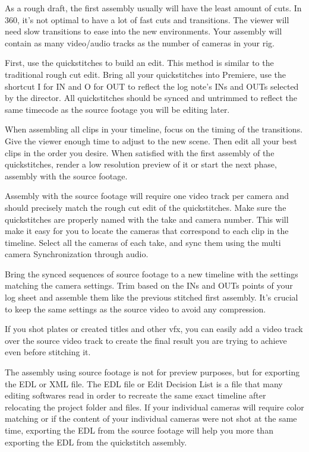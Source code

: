 \begin{fullwidth}
As a rough draft, the first assembly usually will have the least amount of cuts. In 360, it’s not optimal to have a lot of fast cuts and transitions. The viewer will need slow transitions to ease into the new environments. Your assembly will contain as many video/audio tracks as the number of cameras in your rig. 

First, use the quickstitches to build an edit. This method is similar to the traditional rough cut edit. Bring all your quickstitches into Premiere, use the shortcut I for IN and O for OUT to reflect the log note’s INs and OUTs selected by the director. All quickstitches should be synced and untrimmed to reflect the same timecode as the source footage you will be editing later.

When assembling all clips in your timeline, focus on the timing of the transitions. Give the viewer enough time to adjust to the new scene. Then edit all your best clips in the order you desire. When satisfied with the first assembly of the quickstitches, render a low resolution preview of it or start the next phase, assembly with the source footage.


Assembly with the source footage will require one video track per camera and should precisely match the rough cut edit of the quickstitches. Make sure the quickstitches are properly named with the take and camera number. This will make it easy for you to locate the cameras that correspond to each clip in the timeline. Select all the cameras of each take, and sync them using the multi camera Synchronization through audio.

Bring the synced sequences of source footage to a new timeline with the settings matching the camera settings. Trim based on the INs and OUTs points of your log sheet and assemble them like the previous stitched first assembly. It’s crucial to keep the same settings as the source video to avoid any compression. 

If you shot plates or created titles and other vfx, you can easily add a video track over the source video track to create the final result you are trying to achieve even before stitching it.


The assembly using source footage is not for preview purposes, but for exporting the EDL or XML file. The EDL file or Edit Decision List is a file that many editing softwares read in order to recreate the same exact timeline after relocating the project folder and files. If your individual cameras will require color matching or if the content of your individual cameras were not shot at the same time, exporting the EDL from the source footage will help you more than exporting the EDL from the quickstitch assembly.


\end{fullwidth}
